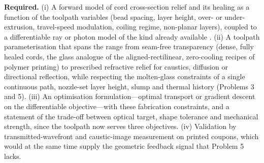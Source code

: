 \textbf{Required.} (i) A forward model of cord cross-section relief and its healing as a function of the toolpath variables (bead spacing, layer height, over- or under-extrusion, travel-speed modulation, coiling regime, non-planar layers), coupled to a differentiable ray or photon model of the kind already available \citep{weber2020photon,kassubeck2021caustics}. (ii) A toolpath parameterisation that spans the range from seam-free transparency (dense, fully healed cords, the glass analogue of the aligned-rectilinear, zero-cooling recipes of polymer printing) to prescribed refractive relief for caustics, diffusion or directional reflection, while respecting the molten-glass constraints of a single continuous path, nozzle-set layer height, slump and thermal history (Problems 3 and 5). (iii) An optimisation formulation---optimal transport or gradient descent on the differentiable objective---with these fabrication constraints, and a statement of the trade-off between optical target, shape tolerance and mechanical strength, since the toolpath now serves three objectives. (iv) Validation by transmitted-wavefront and caustic-image measurement on printed coupons, which would at the same time supply the geometric feedback signal that Problem 5 lacks.
